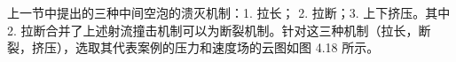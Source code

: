 上一节中提出的三种中间空泡的溃灭机制：1. 拉长； 2. 拉断；3.
上下挤压。其中 2.
拉断合并了上述射流撞击机制可以为断裂机制。针对这三种机制（拉长，断裂，挤压），选取其代表案例的压力和速度场的云图如图
4.18 所示。

\begin{figure}[H]
    \centering
  
\end{figure}
